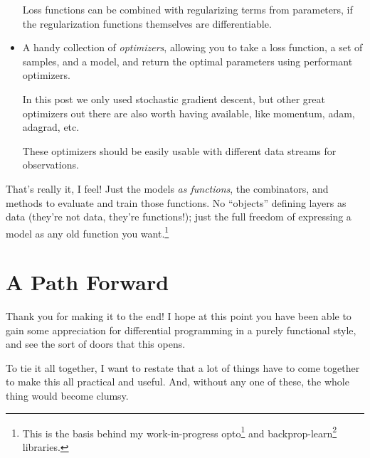 \documentclass[]{article}
\renewcommand{\href}[2]{#2\footnote{\url{#1}}}
\begin{document}
\begin{itemize}
  Loss functions can be combined with regularizing terms from parameters, if the
  regularization functions themselves are differentiable.
\item
  A handy collection of \emph{optimizers}, allowing you to take a loss function,
  a set of samples, and a model, and return the optimal parameters using
  performant optimizers.

  In this post we only used stochastic gradient descent, but other great
  optimizers out there are also worth having available, like momentum, adam,
  adagrad, etc.

  These optimizers should be easily usable with different data streams for
  observations.
\end{itemize}

That's really it, I feel! Just the models \emph{as functions}, the combinators,
and methods to evaluate and train those functions. No ``objects'' defining
layers as data (they're not data, they're functions!); just the full freedom of
expressing a model as any old function you want.\footnote{This is the basis
  behind my work-in-progress \href{https://github.com/mstksg/opto}{opto} and
  \href{https://github.com/mstksg/backprop-learn}{backprop-learn} libraries.}

\hypertarget{a-path-forward}{%
\section{A Path Forward}\label{a-path-forward}}

Thank you for making it to the end! I hope at this point you have been able to
gain some appreciation for differential programming in a purely functional
style, and see the sort of doors that this opens.

To tie it all together, I want to restate that a lot of things have to come
together to make this all practical and useful. And, without any one of these,
the whole thing would become clumsy.
\end{document}
